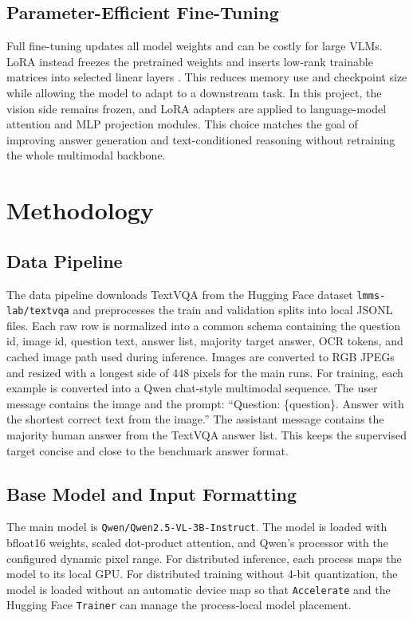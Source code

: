 \documentclass[11pt]{article}
\begin{document}
\subsection{Parameter-Efficient Fine-Tuning}

Full fine-tuning updates all model weights and can be costly for large VLMs. LoRA instead freezes the pretrained weights and inserts low-rank trainable matrices into selected linear layers \cite{hu2022lora}. This reduces memory use and checkpoint size while allowing the model to adapt to a downstream task. In this project, the vision side remains frozen, and LoRA adapters are applied to language-model attention and MLP projection modules. This choice matches the goal of improving answer generation and text-conditioned reasoning without retraining the whole multimodal backbone.

\section{Methodology}

\subsection{Data Pipeline}

The data pipeline downloads TextVQA from the Hugging Face dataset \texttt{lmms-lab/textvqa} and preprocesses the train and validation splits into local JSONL files. Each raw row is normalized into a common schema containing the question id, image id, question text, answer list, majority target answer, OCR tokens, and cached image path used during inference. Images are converted to RGB JPEGs and resized with a longest side of 448 pixels for the main runs. 
For training, each example is converted into a Qwen chat-style multimodal sequence. The user message contains the image and the prompt: ``Question: \{question\}. Answer with the shortest correct text from the image.'' The assistant message contains the majority human answer from the TextVQA answer list. This keeps the supervised target concise and close to the benchmark answer format.

\subsection{Base Model and Input Formatting}

The main model is \texttt{Qwen/Qwen2.5-VL-3B-Instruct}. The model is loaded with bfloat16 weights, scaled dot-product attention, and Qwen's processor with the configured dynamic pixel range. For distributed inference, each process maps the model to its local GPU. For distributed training without 4-bit quantization, the model is loaded without an automatic device map so that \texttt{Accelerate} and the Hugging Face \texttt{Trainer} can manage the process-local model placement.
\end{document}
